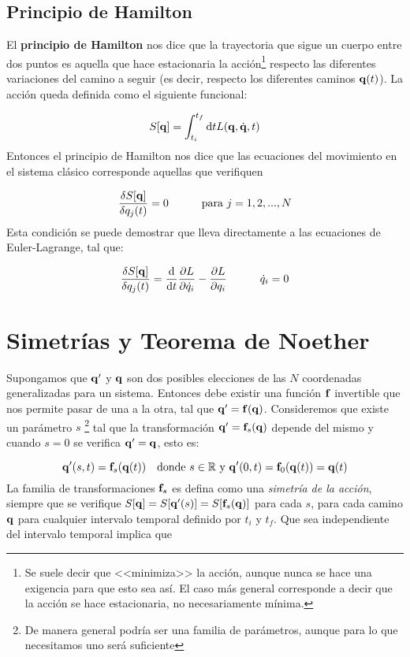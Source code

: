 \subsection{Principio de Hamilton}

El \textbf{principio de Hamilton} nos dice que la trayectoria que sigue un cuerpo entre dos puntos es aquella que hace estacionaria la acción\footnote{Se suele decir que <<minimiza>> la acción, aunque nunca se hace una exigencia para que esto sea así. El caso más general corresponde a decir que la acción se hace estacionaria, no necesariamente mínima.} respecto las diferentes variaciones del camino a seguir (es decir, respecto los diferentes caminos $\mathbf{q}(t)$). La acción queda definida como el siguiente funcional:

\begin{equation}
	S[\mathbf{q}] = \int_{t_i}^{t_f} \mathrm{d} t L(\mathbf{q},\dot{\mathbf{q}},t)
\end{equation} 
Entonces el principio de Hamilton nos dice que las ecuaciones del movimiento en el sistema clásico corresponde aquellas que verifiquen 

\begin{equation}
	\frac{\delta S[\mathbf{q}]}{\delta q_j (t)} =  0 \quad \quad \quad \text{para} \ j=1,2,...,N
\end{equation}
Esta condición se puede demostrar que lleva directamente a las ecuaciones de Euler-Lagrange, tal que: 

\begin{equation}
	\frac{\delta S[\mathbf{q}]}{\delta q_j (t)} = \frac{\mathrm{d} }{\mathrm{d} t} \frac{\partial L}{\partial \dot{q}_i} - \frac{\partial L}{\partial q_i} \quad \quad \quad \dot{q}_i = 0 
\end{equation}


\section{Simetrías y Teorema de Noether} \label{Sec:01-02}

Supongamos que $\mathbf{q}'$ y $\mathbf{q}$ son dos posibles elecciones de las $N$ coordenadas generalizadas para un sistema. Entonces debe existir una función $\mathbf{f}$ invertible que nos permite pasar de una a la otra, tal que $\mathbf{q}'=\mathbf{f}(\mathbf{q})$. Consideremos que existe un  parámetro $s$  \footnote{De manera general podría ser una familia de parámetros, aunque para lo que necesitamos uno será suficiente} tal que la transformación $\mathbf{q}'=\mathbf{f}_s(\mathbf{q})$ depende del mismo y cuando $s=0$ se verifica $\mathbf{q}'=\mathbf{q}$, esto es:

\begin{equation}
	\mathbf{q}' (s,t) = \mathbf{f}_s (\mathbf{q} (t)) \quad \text{donde} \ s \in \mathbb{R} \ \text{y} \ \mathbf{q}'(0,t) = \mathbf{f}_0 (\mathbf{q}(t)) = \mathbf{q}(t)
\end{equation}
La familia de transformaciones $\mathbf{f}_s$ es defina como una \textit{simetría de la acción},
siempre que se verifique $S[\mathbf{q}] = S[\mathbf{q}'(s)] = S[\mathbf{f}_s(\mathbf{q})]$ para cada $s$, para cada camino $\mathbf{q}$ para cualquier intervalo temporal definido por $t_i$ y $t_f$. Que sea independiente del intervalo temporal implica que


